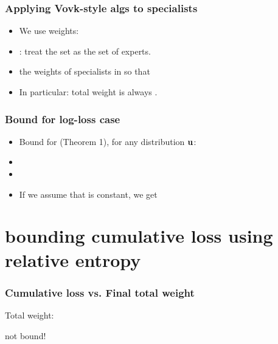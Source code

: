 \documentclass[handout]{beamer}
\begin{document}
\begin{frame}
\frametitle{Applying Vovk-style algs to specialists}
\begin{itemize}
\item We use  weights: 
\item {}: treat the set  as the set of experts.
\item {} the weights of specialists in  so that
\R{\[
\sum_{i\in E^t} v_i^t = \sum_{i\in E^t} v_i^{t+1}
\]}
\item
In particular: total weight is always .
\end{itemize}
\end{frame}

\begin{frame}
\frametitle{Bound for log-loss case}
\begin{itemize}
\item
Bound for  (Theorem 1), for any distribution ${\mathbf u}$:
\item {}
\item {}
\item If we assume that  is constant, we get
\R{\[
L_A \leq \sum_{t=1}^T \ell_{\vu}^t + \frac{\RE{\vu}{\vv^1}}{U}
\]} 
\end{itemize}
\end{frame}

\section{bounding cumulative loss using relative entropy}
\begin{frame}
\frametitle{Cumulative loss vs. Final total weight}

 Total weight: 

 
 
\R{\[
\onslide<8-> -\log W^{T+1} =
\onslide<6-> -\log \frac{W^{T+1}}{W^1} = -\sum_{t=1}^T \log p_A^t(c^t)
\onslide<7-> = L_A^T
\]}
  not bound!
\end{frame}
\end{document}
